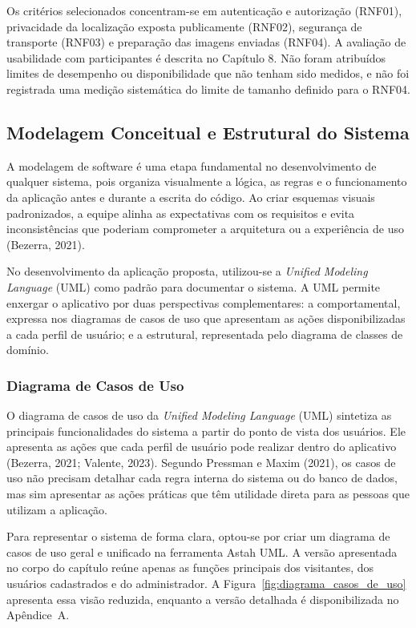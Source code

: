 Os critérios selecionados concentram-se em autenticação e autorização (RNF01), privacidade da localização exposta publicamente (RNF02), segurança de transporte (RNF03) e preparação das imagens enviadas (RNF04). A avaliação de usabilidade com participantes é descrita no Capítulo 8. Não foram atribuídos limites de desempenho ou disponibilidade que não tenham sido medidos, e não foi registrada uma medição sistemática do limite de tamanho definido para o RNF04.


\subsection{Modelagem Conceitual e Estrutural do Sistema}

A modelagem de software é uma etapa fundamental no desenvolvimento de qualquer sistema, pois organiza visualmente a lógica, as regras e o funcionamento da aplicação antes e durante a escrita do código. Ao criar esquemas visuais padronizados, a equipe alinha as expectativas com os requisitos e evita inconsistências que poderiam comprometer a arquitetura ou a experiência de uso (Bezerra, 2021).

No desenvolvimento da aplicação proposta, utilizou-se a \textit{Unified Modeling Language} (UML) como padrão para documentar o sistema. A UML permite enxergar o aplicativo por duas perspectivas complementares: a comportamental, expressa nos diagramas de casos de uso que apresentam as ações disponibilizadas a cada perfil de usuário; e a estrutural, representada pelo diagrama de classes de domínio.


\subsubsection{Diagrama de Casos de Uso}

O diagrama de casos de uso da \textit{Unified Modeling Language} (UML) sintetiza as principais funcionalidades do sistema a partir do ponto de vista dos usuários. Ele apresenta as ações que cada perfil de usuário pode realizar dentro do aplicativo (Bezerra, 2021; Valente, 2023). Segundo Pressman e Maxim (2021), os casos de uso não precisam detalhar cada regra interna do sistema ou do banco de dados, mas sim apresentar as ações práticas que têm utilidade direta para as pessoas que utilizam a aplicação.

Para representar o sistema de forma clara, optou-se por criar um diagrama de casos de uso geral e unificado na ferramenta Astah UML. A versão apresentada no corpo do capítulo reúne apenas as funções principais dos visitantes, dos usuários cadastrados e do administrador. A Figura~\ref{fig:diagrama_casos_de_uso} apresenta essa visão reduzida, enquanto a versão detalhada é disponibilizada no Apêndice~A.

